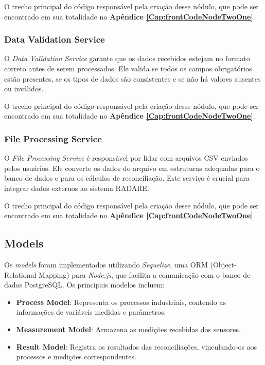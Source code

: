 O trecho principal do código responsável pela criação desse nódulo, que pode ser encontrado em sua totalidade no \textbf{Apêndice \ref{Cap:frontCodeNodeTwoOne}}.
\subsubsection{Data Validation Service}

O \textit{Data Validation Service} garante que os dados recebidos estejam no formato correto antes de serem processados. Ele valida se todos os campos obrigatórios estão presentes, se os tipos de dados são consistentes e se não há valores ausentes ou inválidos.

O trecho principal do código responsável pela criação desse nódulo, que pode ser encontrado em sua totalidade no \textbf{Apêndice \ref{Cap:frontCodeNodeTwoOne}}.

\subsubsection{File Processing Service}

O \textit{File Processing Service} é responsável por lidar com arquivos CSV enviados pelos usuários. Ele converte os dados do arquivo em estruturas adequadas para o banco de dados e para os cálculos de reconciliação. Este serviço é crucial para integrar dados externos ao sistema RADARE.

O trecho principal do código responsável pela criação desse nódulo, que pode ser encontrado em sua totalidade no \textbf{Apêndice \ref{Cap:frontCodeNodeTwoOne}}.

\subsection{Models}

Os \textit{models} foram implementados utilizando \textit{Sequelize}, uma ORM (Object-Relational Mapping) para \textit{Node.js}, que facilita a comunicação com o banco de dados PostgreSQL. Os principais modelos incluem:

\begin{itemize} \item \textbf{Process Model}: Representa os processos industriais, contendo as informações de variáveis medidas e parâmetros. \item \textbf{Measurement Model}: Armazena as medições recebidas dos sensores. \item \textbf{Result Model}: Registra os resultados das reconciliações, vinculando-os aos processos e medições correspondentes. \end{itemize}

